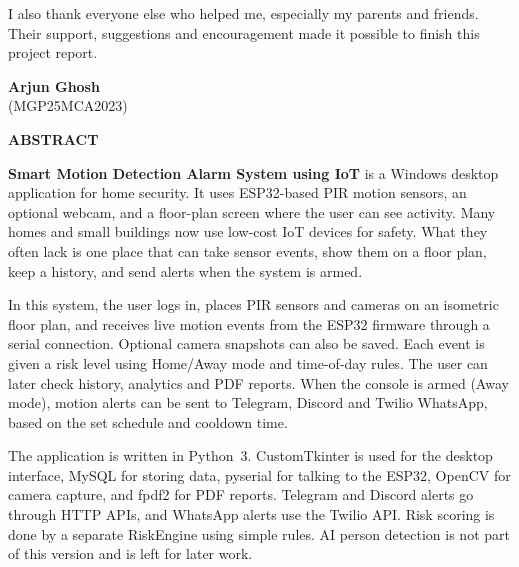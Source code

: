 \documentclass[12pt,a4paper]{report}
\begin{document}
I also thank everyone else who helped me, especially my parents and friends. Their support, suggestions and encouragement made it possible to finish this project report.

\vspace{2cm}

\begin{flushright}
\textbf{Arjun Ghosh}\\
(MGP25MCA2023)
\end{flushright}


\newpage
\thispagestyle{empty}

\begin{center}
\fontsize{16pt}{18pt}\selectfont
\textbf{ABSTRACT}
\end{center}

\vspace{1cm}

\textbf{Smart Motion Detection Alarm System using IoT} is a Windows desktop application for home security. It uses ESP32-based PIR motion sensors, an optional webcam, and a floor-plan screen where the user can see activity. Many homes and small buildings now use low-cost IoT devices for safety. What they often lack is one place that can take sensor events, show them on a floor plan, keep a history, and send alerts when the system is armed.

In this system, the user logs in, places PIR sensors and cameras on an isometric floor plan, and receives live motion events from the ESP32 firmware through a serial connection. Optional camera snapshots can also be saved. Each event is given a risk level using Home/Away mode and time-of-day rules. The user can later check history, analytics and PDF reports. When the console is armed (Away mode), motion alerts can be sent to Telegram, Discord and Twilio WhatsApp, based on the set schedule and cooldown time.

The application is written in Python~3. CustomTkinter is used for the desktop interface, MySQL for storing data, pyserial for talking to the ESP32, OpenCV for camera capture, and fpdf2 for PDF reports. Telegram and Discord alerts go through HTTP APIs, and WhatsApp alerts use the Twilio API. Risk scoring is done by a separate RiskEngine using simple rules. AI person detection is not part of this version and is left for later work.
\end{document}
